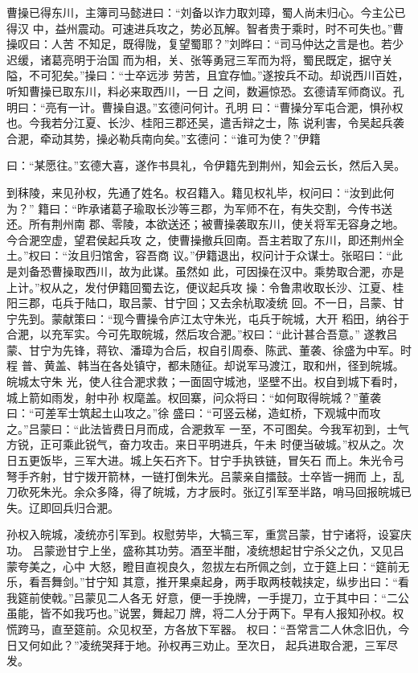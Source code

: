 曹操已得东川，主簿司马懿进曰：“刘备以诈力取刘璋，蜀人尚未归心。今主公已得汉
中，益州震动。可速进兵攻之，势必瓦解。智者贵于乘时，时不可失也。”曹操叹曰：人苦
不知足，既得陇，复望蜀耶？”刘晔曰：“司马仲达之言是也。若少迟缓，诸葛亮明于治国
而为相，关、张等勇冠三军而为将，蜀民既定，据守关隘，不可犯矣。”操曰：“士卒远涉
劳苦，且宜存恤。”遂按兵不动。却说西川百姓，听知曹操已取东川，料必来取西川，一日
之间，数遍惊恐。玄德请军师商议。孔明曰：“亮有一计。曹操自退。”玄德问何计。孔明
曰：“曹操分军屯合淝，惧孙权也。今我若分江夏、长沙、桂阳三郡还吴，遣舌辩之士，陈
说利害，令吴起兵袭合淝，牵动其势，操必勒兵南向矣。”玄德问：“谁可为使？”伊籍

曰：“某愿往。”玄德大喜，遂作书具礼，令伊籍先到荆州，知会云长，然后入吴。

到秣陵，来见孙权，先通了姓名。权召籍入。籍见权礼毕，权问曰：“汝到此何为？”
籍曰：“昨承诸葛子瑜取长沙等三郡，为军师不在，有失交割，今传书送还。所有荆州南
郡、零陵，本欲送还；被曹操袭取东川，使关将军无容身之地。今合淝空虚，望君侯起兵攻
之，使曹操撤兵回南。吾主若取了东川，即还荆州全土。”权曰：“汝且归馆舍，容吾商
议。”伊籍退出，权问计于众谋士。张昭曰：“此是刘备恐曹操取西川，故为此谋。虽然如
此，可因操在汉中。乘势取合淝，亦是上计。”权从之，发付伊籍回蜀去讫，便议起兵攻
操：令鲁肃收取长沙、江夏、桂阳三郡，屯兵于陆口，取吕蒙、甘宁回；又去余杭取凌统
回。不一日，吕蒙、甘宁先到。蒙献策曰：“现今曹操令庐江太守朱光，屯兵于皖城，大开
稻田，纳谷于合淝，以充军实。今可先取皖城，然后攻合淝。”权曰：“此计甚合吾意。”
遂教吕蒙、甘宁为先锋，蒋钦、潘璋为合后，权自引周泰、陈武、董袭、徐盛为中军。时程
普、黄盖、韩当在各处镇守，都未随征。却说军马渡江，取和州，径到皖城。皖城太守朱
光，使人往合淝求救；一面固守城池，坚壁不出。权自到城下看时，城上箭如雨发，射中孙
权麾盖。权回寨，问众将曰：“如何取得皖城？”董袭曰：“可差军士筑起土山攻之。”徐
盛曰：“可竖云梯，造虹桥，下观城中而攻之。”吕蒙曰：“此法皆费日月而成，合淝救军
一至，不可图矣。今我军初到，士气方锐，正可乘此锐气，奋力攻击。来日平明进兵，午未
时便当破城。”权从之。次日五更饭毕，三军大进。城上矢石齐下。甘宁手执铁链，冒矢石
而上。朱光令弓弩手齐射，甘宁拨开箭林，一链打倒朱光。吕蒙亲自擂鼓。士卒皆一拥而
上，乱刀砍死朱光。余众多降，得了皖城，方才辰时。张辽引军至半路，哨马回报皖城已
失。辽即回兵归合淝。

孙权入皖城，凌统亦引军到。权慰劳毕，大犒三军，重赏吕蒙，甘宁诸将，设宴庆功。
吕蒙逊甘宁上坐，盛称其功劳。酒至半酣，凌统想起甘宁杀父之仇，又见吕蒙夸美之，心中
大怒，瞪目直视良久，忽拔左右所佩之剑，立于筵上曰：“筵前无乐，看吾舞剑。”甘宁知
其意，推开果桌起身，两手取两枝戟挟定，纵步出曰：“看我筵前使戟。”吕蒙见二人各无
好意，便一手挽牌，一手提刀，立于其中曰：“二公虽能，皆不如我巧也。”说罢，舞起刀
牌，将二人分于两下。早有人报知孙权。权慌跨马，直至筵前。众见权至，方各放下军器。
权曰：“吾常言二人休念旧仇，今日又何如此？”凌统哭拜于地。孙权再三劝止。至次日，
起兵进取合淝，三军尽发。

